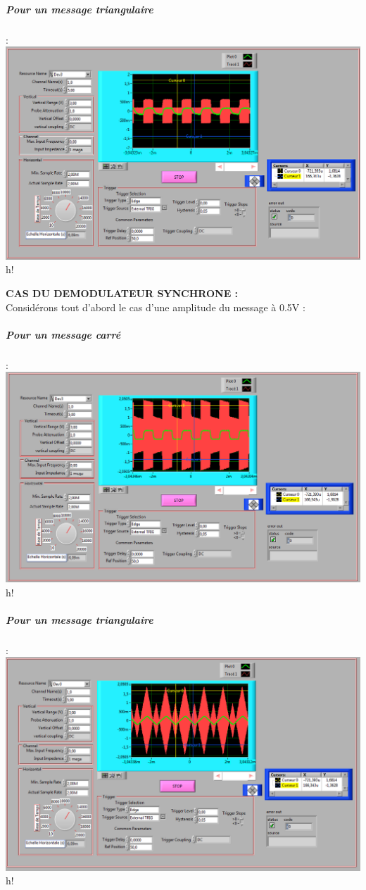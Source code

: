 \documentclass[french]{article}
\begin{document}
\subparagraph{Pour un message triangulaire} : \\
\includegraphics[width=\textwidth]{triangle_enveloppe_01.png}{h!}



\textbf{CAS DU DEMODULATEUR SYNCHRONE :}\\


Considérons tout d'abord le cas d'une amplitude du message à 0.5V : 
\subparagraph{Pour un message carré} : \\
\includegraphics[width=\textwidth]{carre_synchrone_05.png}{h!}

\subparagraph{Pour un message triangulaire} : \\
\includegraphics[width=\textwidth]{triangle_synchrone_05.png}{h!}
\end{document}

